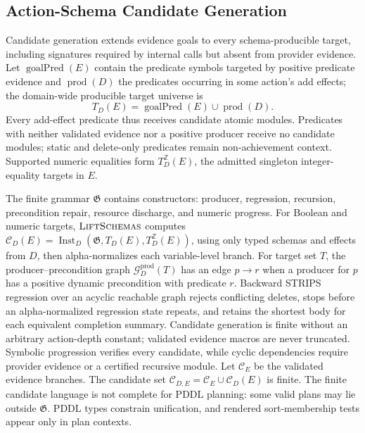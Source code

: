 \subsection{Action-Schema Candidate Generation}

Candidate generation extends evidence goals to every schema-producible target,
including signatures required by internal calls but absent from provider
evidence.
Let $\operatorname{goalPred}(E)$ contain the predicate symbols targeted by
positive predicate evidence and $\operatorname{prod}(D)$ the predicates
occurring in some action's add effects; the domain-wide producible target
universe is
\[
T_D(E)=\operatorname{goalPred}(E)\cup\operatorname{prod}(D).
\]
Every add-effect predicate thus receives candidate atomic modules. Predicates
with neither validated evidence nor a positive producer receive no candidate
modules; static and
delete-only predicates remain non-achievement context. Supported numeric
equalities form $T_D^{\mathbb Z}(E)$, the admitted singleton integer-equality
targets in $E$.

The finite grammar $\mathfrak G$ contains constructors: producer,
regression, recursion, precondition repair, resource discharge, and numeric
progress. For Boolean and numeric targets, $\textsc{LiftSchemas}$ computes
$\mathcal C_D(E)=
\operatorname{Inst}_D(\mathfrak G,T_D(E),T_D^{\mathbb Z}(E))$,
using only typed schemas and effects from $D$, then alpha-normalizes each
variable-level branch.
For target set $T$, the producer--precondition graph
$\mathcal G_D^{\mathrm{prod}}(T)$ has an edge $p\rightarrow r$ when a producer
for $p$ has a positive dynamic precondition with predicate $r$.
Backward STRIPS regression
\cite{Fikes1972GeneralizedRobotPlans,Alcazar2013Regression,Chen2026Moose}
over an acyclic reachable graph rejects conflicting deletes, stops
before an alpha-normalized regression state repeats, and retains the shortest
body for each equivalent completion summary. Candidate generation is finite
without an arbitrary action-depth constant; validated
evidence macros are never truncated. Symbolic progression verifies every
candidate, while cyclic dependencies require provider evidence or a
certified recursive module. Let $\mathcal C_E$ be the validated evidence
branches. The candidate set
$\mathcal C_{D,E}=\mathcal C_E\cup\mathcal C_D(E)$ is finite. The finite
candidate language is not complete for PDDL planning: some valid plans may lie
outside $\mathfrak G$. PDDL types constrain unification, and rendered
sort-membership tests appear only in plan contexts.

